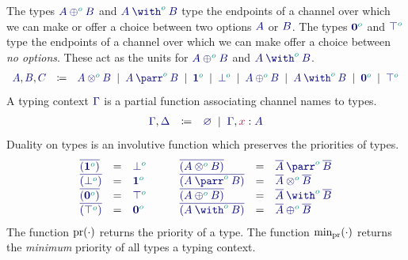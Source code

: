 \documentclass[main.tex]{subfiles}
\begin{document}
The types $\ty{\typlus[\cs{o}]{A}{B}}$ and $\ty{\tywith[\cs{o}]{A}{B}}$ type the endpoints of a channel over which we can make or offer a choice between two options $\ty{A}$ or $\ty{B}$.
The types $\ty{\tynil[\cs{o}]}$ and $\ty{\tytop[\cs{o}]}$ type the endpoints of a channel over which we can make offer a choice between \emph{no options}. These act as the units for $\ty{\typlus[\cs{o}]{A}{B}}$ and $\ty{\tywith[\cs{o}]{A}{B}}$.
\[
\begin{array}{lcl}
  \ty{A}, \ty{B}, \ty{C}
  & \coloneqq & \ty{\tytens[\cs{o}]{A}{B}}
    \sep        \ty{\typarr[\cs{o}]{A}{B}}
    \sep        \ty{\tyone[\cs{o}]}
    \sep        \ty{\tybot[\cs{o}]}
    \sep        \ty{\typlus[\cs{o}]{A}{B}}
    \sep        \ty{\tywith[\cs{o}]{A}{B}}
    \sep        \ty{\tynil[\cs{o}]}
    \sep        \ty{\tytop[\cs{o}]}
\end{array}
\]
A typing context $\ty\Gamma$ is a partial function associating channel names to types.
\[
\begin{array}{lcl}
  \ty{\Gamma}, \ty{\Delta}
  & \coloneqq & \ty{\emptyenv}
    \sep        \ty{\Gamma}, \tmty{x}{A}
\end{array}
\]
Duality on types is an involutive function which preserves the priorities of types.
\[
\begin{array}{lcl}
  \ty{\co{(\tyone[\cs{o}])}} & = & \ty{\tybot[\cs{o}]} \\
  \ty{\co{(\tybot[\cs{o}])}} & = & \ty{\tyone[\cs{o}]} \\
  \ty{\co{(\tynil[\cs{o}])}} & = & \ty{\tytop[\cs{o}]} \\
  \ty{\co{(\tytop[\cs{o}])}} & = & \ty{\tynil[\cs{o}]}
\end{array}
\qquad
\begin{array}{lcl}
  \ty{\co{(\tytens[\cs{o}]{A}{B})}} & = & \ty{\typarr[\cs{o}]{\co{A}}{\co{B}}} \\
  \ty{\co{(\typarr[\cs{o}]{A}{B})}} & = & \ty{\tytens[\cs{o}]{\co{A}}{\co{B}}} \\
  \ty{\co{(\typlus[\cs{o}]{A}{B})}} & = & \ty{\tywith[\cs{o}]{\co{A}}{\co{B}}} \\
  \ty{\co{(\tywith[\cs{o}]{A}{B})}} & = & \ty{\typlus[\cs{o}]{\co{A}}{\co{B}}}
\end{array}
\]
The function $\operatorname{pr}(\cdot)$ returns the priority of a type. The function $\text{min}_{\operatorname{pr}}(\cdot)$ returns the \emph{minimum} priority of all types a typing context.
\end{document}
